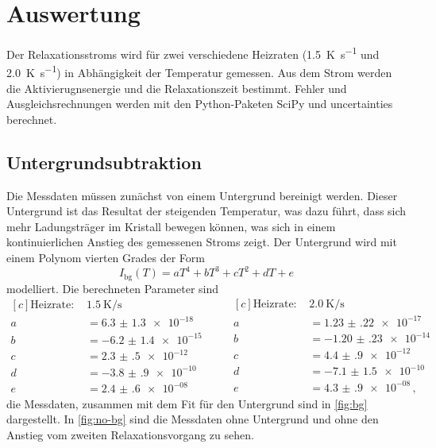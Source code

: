 \section{Auswertung}

Der Relaxationsstroms wird für zwei verschiedene Heizraten (\SI{1.5}{\kelvin\per\second} und \SI{2.0}{\kelvin\per\second}) in Abhängigkeit der Temperatur gemessen. Aus dem Strom werden die Aktivierugnsenergie und die Relaxationszeit bestimmt. Fehler und Ausgleichsrechnungen werden mit den Python-Paketen SciPy \cite{scipy} und uncertainties \cite{uncertain} berechnet.

\subsection{Untergrundsubtraktion}

Die Messdaten müssen zunächst von einem Untergrund bereinigt werden. Dieser Untergrund ist das Resultat der steigenden Temperatur, was dazu führt, dass sich mehr Ladungsträger im Kristall bewegen können, was sich in einem kontinuierlichen Anstieg des gemessenen Stroms zeigt. Der Untergrund wird mit einem Polynom vierten Grades der Form
\begin{equation}
  I_\text{bg}(T) = aT^4 + bT^3 + cT^2 + dT + e
\end{equation}
modelliert. Die berechneten Parameter sind
\begin{equation*}
\begin{aligned}[c]
  \text{Heizrate: }& \SI{1.5}{\kelvin\per\second}\\
  a &= \num{6.3(13)e-18}\\
  b &= \num{-6.2(14)e-15}\\
  c &= \num{2.3(5)e-12}\\
  d &= \num{-3.8(9)e-10}\\
  e &= \num{2.4(6)e-08}
\end{aligned}
\qquad
\begin{aligned}[c]
  \text{Heizrate: }& \SI{2.0}{\kelvin\per\second}\\
  a &= \num{1.23(22)e-17}\\
  b &= \num{-1.20(23)e-14}\\
  c &= \num{4.4(9)e-12}\\
  d &= \num{-7.1(15)e-10}\\
  e &= \num{4.3(9)e-08}\,,
\end{aligned}
\end{equation*}
die Messdaten, zusammen mit dem Fit für den Untergrund sind in \autoref{fig:bg} dargestellt. In \autoref{fig:no-bg} sind die Messdaten ohne Untergrund und ohne den Anstieg vom zweiten Relaxationsvorgang zu sehen.

